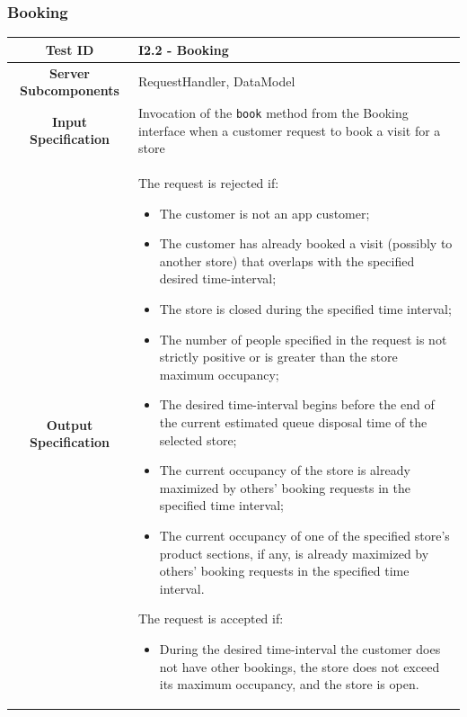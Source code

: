 \documentclass[a4paper,oneside,11pt]{book}
\begin{document}
    \newpage
    \subsubsection{Booking}
    \begin{longtable}[c]{|>{\bfseries{}}c|H{.5\textwidth}|}
        \hline
        Test ID & I2.2 - Booking \\ \hline
        Server Subcomponents & RequestHandler, DataModel \\ \hline
        Input Specification & Invocation of the \texttt{book} method from the Booking interface when a customer request to book a visit for a store \\ \hline
        Output Specification & The request is rejected if:
        \begin{itemize}
            \item The customer is not an app customer;
            \item The customer has already booked a visit (possibly to another store) that overlaps with the specified desired time-interval;
            \item The store is closed during the specified time interval;
            \item The number of people specified in the request is not strictly positive or is greater than the store maximum occupancy;
            \item The desired time-interval begins before the end of the current estimated queue disposal time of the selected store;
            \item The current occupancy of the store is already maximized by others’ booking requests in the specified time interval;
            \item The current occupancy of one of the specified store’s product sections, if any, is already maximized by others’ booking requests in the specified time interval.
        \end{itemize}
        The request is accepted if:
        \begin{itemize}
            \item  During the desired time-interval the customer does not have other bookings, the store does not exceed its maximum occupancy, and the store is open.
        \end{itemize} \\ \hline

\end{longtable}
\end{document}

